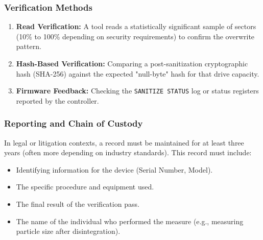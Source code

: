 \subsubsection*{Verification Methods}
\begin{enumerate}
    \item \textbf{Read Verification:} A tool reads a statistically significant sample of sectors (10\% to 100\% depending on security requirements) to confirm the overwrite pattern.
    \item \textbf{Hash-Based Verification:} Comparing a post-sanitization cryptographic hash (SHA-256) against the expected "null-byte" hash for that drive capacity.
    \item \textbf{Firmware Feedback:} Checking the \texttt{SANITIZE STATUS} log or status registers reported by the controller.
\end{enumerate}

\subsubsection*{Reporting and Chain of Custody}
In legal or litigation contexts, a record must be maintained for at least three years (often more depending on industry standards). This record must include:
\begin{itemize}
    \item Identifying information for the device (Serial Number, Model).
    \item The specific procedure and equipment used.
    \item The final result of the verification pass.
    \item The name of the individual who performed the measure (e.g., measuring particle size after disintegration).
\end{itemize}